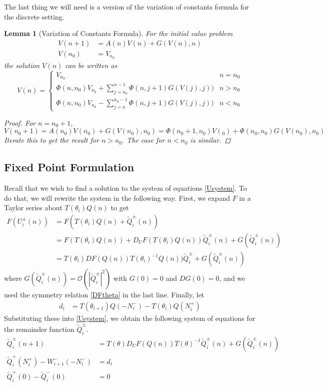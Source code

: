 \documentclass[12pt]{article}
\newtheorem{lemma}{Lemma}
\begin{document}
The last thing we will need is a version of the variation of constants formula for the discrete setting.

\begin{lemma}[Variation of Constants Formula]\label{VOC}
For the initial value problem
\begin{align*}
V(n+1) &= A(n) V(n) + G(V(n), n) \\
V(n_0) &= V_{n_0}
\end{align*}
the solution $V(n)$ can be written as 
\begin{equation}\label{VOCformula}
V(n) = 
\begin{cases}
V_{n_0} & n = n_0 \\
\Phi(n, n_0) V_{n_0} + \sum_{j = n_0}^{n-1} \Phi(n, j+1) G(V(j), j)) & n > n_0 \\
\Phi(n, n_0) V_{n_0} - \sum_{j = n}^{n_0-1} \Phi(n, j+1) G(V(j), j)) & n < n_0 
\end{cases}
\end{equation}
\begin{proof}
For $n = n_0 + 1$,
\[
V(n_0 + 1) = A(n_0) V(n_0) + G(V(n_0), n_0) = \Phi(n_0+1, n_0) V(_0) + \Phi(n_0, n_0) G(V(n_0), n_0)
\]
Iterate this to get the result for $n > n_0$. The case for $n < n_0$ is similar.
\end{proof}
\end{lemma}

\subsection{Fixed Point Formulation}

Recall that we wish to find a solution to the system of equations \eqref{Usystem}. To do that, we will rewrite the system in the following way. First, we expand $F$ in a Taylor series about $T(\theta_i) Q(n)$ to get
\begin{align*}
F(U_i^\pm(n)) &= F(T(\theta_i) Q(n) + \tilde{Q}_i^\pm(n)) \\
&= F(T(\theta_i) Q(n)) + D_U F(T(\theta_i) Q(n)) \tilde{Q}_i^\pm(n) + G(\tilde{Q}_i^\pm(n)) \\
&= T(\theta_i)DF(Q(n))T(\theta_i)^{-1} Q(n)) \tilde{Q}_i^\pm + G(\tilde{Q}_i^\pm(n))
\end{align*}
where $G(\tilde{Q}_i^\pm(n)) = \mathcal{O}(|\tilde{Q}_i^\pm|^2)$ with $G(0) = 0$ and $DG(0) = 0$, and we used the symmetry relation \eqref{DFtheta} in the last line. Finally, let
\begin{align} \label{didef}
d_i &= T(\theta_{i+1}) Q(-N_i^-) - T(\theta_i) Q(N_i^+)
\end{align}
Substituting these into \eqref{Usystem}, we obtain the following system of equations for the remainder function $\tilde{Q}_i^\pm$.
\begin{align}
\tilde{Q}_i^\pm(n+1) &= T(\theta)D_U F(Q(n))T(\theta)^{-1} \tilde{Q}_i^\pm(n) + G(\tilde{Q}_i^\pm(n)) \label{Wsystem1} \\
\tilde{Q}_i^+(N_i^+) - W_{i+1}^-(-N_i^-) &= d_i \label{Wsystem2} \\
\tilde{Q}_i^+(0) - \tilde{Q}_i^-(0) &= 0 \label{Wsystem3}
\end{align}
\end{document}

